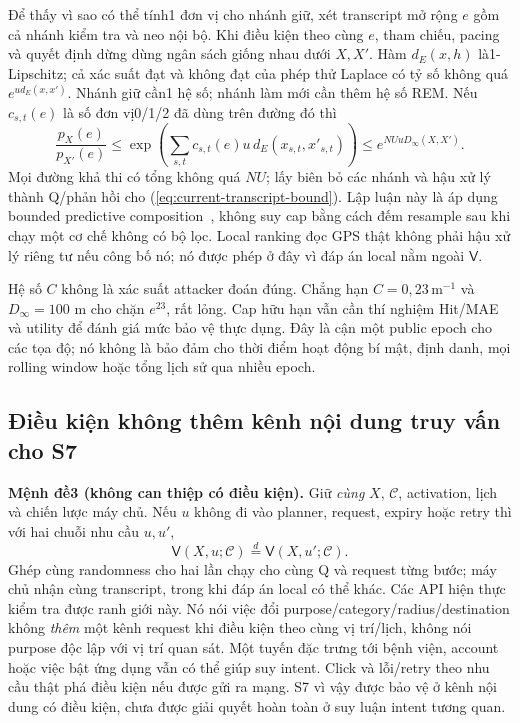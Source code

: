 Để thấy vì sao có thể tính1 đơn vị cho nhánh giữ, xét transcript mở rộng $e$ gồm cả nhánh kiểm tra và neo nội bộ. Khi điều kiện theo cùng $e$, tham chiếu, pacing và quyết định dừng dùng ngân sách giống nhau dưới $X,X'$. Hàm $d_E(x,h)$ là1-Lipschitz; cả xác suất đạt và không đạt của phép thử Laplace có tỷ số không quá $e^{u d_E(x,x')}$. Nhánh giữ cần1 hệ số; nhánh làm mới cần thêm hệ số REM. Nếu $c_{s,t}(e)$ là số đơn vị0/1/2 đã dùng trên đường đó thì
\[
 \frac{p_X(e)}{p_{X'}(e)}
 \leq\exp\!\left(\sum_{s,t}c_{s,t}(e)u\,d_E(x_{s,t},x'_{s,t})\right)
 \leq e^{N Uu D_\infty(X,X')}.
\]
Mọi đường khả thi có tổng không quá $NU$; lấy biên bỏ các nhánh và hậu xử lý thành Q/phản hồi cho (\ref{eq:current-transcript-bound}). Lập luận này là áp dụng bounded predictive composition~\cite{chatzikokolakis2014predictive}, không suy cap bằng cách đếm resample sau khi chạy một cơ chế không có bộ lọc. Local ranking đọc GPS thật không phải hậu xử lý riêng tư nếu công bố nó; nó được phép ở đây vì đáp án local nằm ngoài $\mathsf V$.

Hệ số $C$ không là xác suất attacker đoán đúng. Chẳng hạn $C=0{,}23\,\mathrm m^{-1}$ và $D_\infty=100$ m cho chặn $e^{23}$, rất lỏng. Cap hữu hạn vẫn cần thí nghiệm Hit/MAE và utility để đánh giá mức bảo vệ thực dụng. Đây là cận một public epoch cho các tọa độ; nó không là bảo đảm cho thời điểm hoạt động bí mật, định danh, mọi rolling window hoặc tổng lịch sử qua nhiều epoch.

\subsection{Điều kiện không thêm kênh nội dung truy vấn cho S7}

\noindent\textbf{Mệnh đề3 (không can thiệp có điều kiện).} Giữ \emph{cùng} $X$, $\mathcal C$, activation, lịch và chiến lược máy chủ. Nếu $u$ không đi vào planner, request, expiry hoặc retry thì với hai chuỗi nhu cầu $u,u'$,
\begin{equation}
 \mathsf V(X,u;\mathcal C)\overset{d}{=}\mathsf V(X,u';\mathcal C).
 \label{eq:current-purpose-noninterference}
\end{equation}
Ghép cùng randomness cho hai lần chạy cho cùng Q và request từng bước; máy chủ nhận cùng transcript, trong khi đáp án local có thể khác. Các API hiện thực kiểm tra được ranh giới này. Nó nói việc đổi purpose/category/radius/destination không \emph{thêm} một kênh request khi điều kiện theo cùng vị trí/lịch, không nói purpose độc lập với vị trí quan sát. Một tuyến đặc trưng tới bệnh viện, account hoặc việc bật ứng dụng vẫn có thể giúp suy intent. Click và lỗi/retry theo nhu cầu thật phá điều kiện nếu được gửi ra mạng. S7 vì vậy được bảo vệ ở kênh nội dung có điều kiện, chưa được giải quyết hoàn toàn ở suy luận intent tương quan.

